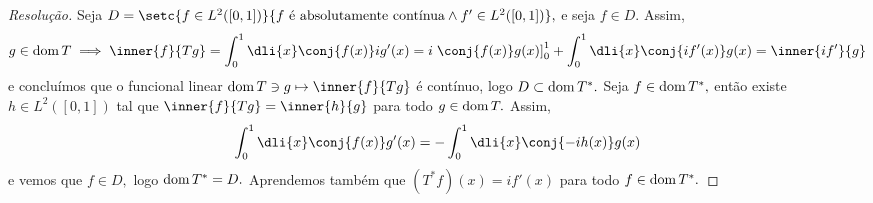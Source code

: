 \begin{proof}[Resolução]
  Seja \(D = \setc{f \in L^2([0,1])}{f\text{ é absolutamente contínua} \land f' \in L^2([0,1])},\) e seja \(f \in D.\) Assim,
  \begin{equation*}
    g \in \dom{T} \implies \inner{f}{Tg} = \int_0^1\dli{x} \conj{f(x)} i g'(x) = i\left.\conj{f(x)}g(x)\right]_0^1 + \int_0^1 \dli{x} \conj{i f'(x)}g(x) = \inner{if'}{g}
  \end{equation*}
  e concluímos que o funcional linear \(\dom{T} \ni g \mapsto \inner{f}{Tg}\) é contínuo, logo \(D \subset \operatorname{dom}{T^*}.\) Seja \(f \in \operatorname{dom}{T^*},\) então existe \(h \in L^2([0,1])\) tal que \(\inner{f}{Tg} = \inner{h}{g}\) para todo \(g \in \operatorname{dom}{T}.\) Assim,
  \begin{equation*}
    \int_0^1\dli{x} \conj{f(x)}g'(x) = -\int_{0}^1\dli{x} \conj{-i h(x)} g(x)
  \end{equation*}
  e vemos que \(f \in D,\) logo \(\operatorname{dom}{T^*} = D.\) Aprendemos também que \((T^*f)(x) = if'(x)\) para todo \(f \in \operatorname{dom}{T^*}.\)
\end{proof}
